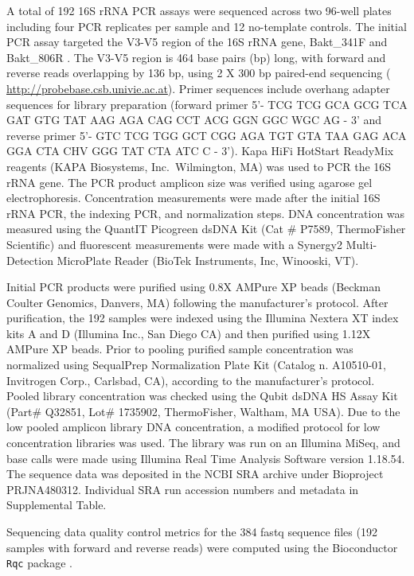 \documentclass[linenumbers]{bmcart}
\begin{document}
A total of 192 16S rRNA PCR assays were sequenced across two 96-well plates including four PCR replicates
per sample and 12 no-template controls. The initial
PCR assay targeted the V3-V5 region of the 16S rRNA gene, Bakt\_341F and
Bakt\_806R \cite{klindworth2012evaluation}. The V3-V5 region is 464
base pairs (bp) long, with forward and reverse reads overlapping by 136
bp, using 2 X 300 bp paired-end sequencing \cite{yang2016sensitivity} (
\url{http://probebase.csb.univie.ac.at}). Primer sequences include
overhang adapter sequences for library preparation (forward primer 5'-
TCG TCG GCA GCG TCA GAT GTG TAT AAG AGA CAG CCT ACG GGN GGC WGC AG - 3'
and reverse primer 5'- GTC TCG TGG GCT CGG AGA TGT GTA TAA GAG ACA GGA
CTA CHV GGG TAT CTA ATC C - 3'). Kapa HiFi HotStart
ReadyMix reagents (KAPA Biosystems, Inc.~Wilmington, MA) was used to PCR the 16S rRNA gene. The PCR product amplicon size
was verified using agarose gel electrophoresis.
Concentration measurements were made after the initial 16S rRNA PCR, the
indexing PCR, and normalization steps. DNA concentration was measured
using the QuantIT Picogreen dsDNA Kit (Cat \# P7589, ThermoFisher
Scientific) and fluorescent measurements were made with a Synergy2
Multi-Detection MicroPlate Reader (BioTek Instruments, Inc, Winooski,
VT).

Initial PCR products were purified using 0.8X AMPure XP beads (Beckman
Coulter Genomics, Danvers, MA) following the manufacturer's protocol.
After purification, the 192 samples were indexed using the Illumina
Nextera XT index kits A and D (Illumina Inc., San Diego CA) and then
purified using 1.12X AMPure XP beads. Prior to pooling purified sample
concentration was normalized using SequalPrep Normalization Plate Kit
(Catalog n. A10510-01, Invitrogen Corp., Carlsbad, CA), according to the
manufacturer's protocol. Pooled library concentration was checked using
the Qubit dsDNA HS Assay Kit (Part\# Q32851, Lot\# 1735902,
ThermoFisher, Waltham, MA USA). Due to the low pooled amplicon library
DNA concentration, a modified protocol for low concentration libraries
was used. The library was run on an Illumina MiSeq, and base calls were
made using Illumina Real Time Analysis Software version 1.18.54.
The sequence data was deposited in the NCBI SRA archive under Bioproject
PRJNA480312. Individual SRA run accession numbers and metadata in Supplemental Table.

Sequencing data quality control metrics for the 384 fastq sequence files
(192 samples with forward and reverse reads) were computed using the
Bioconductor \texttt{Rqc} package \cite{Rqc, Bioconductor}.
\end{document}
